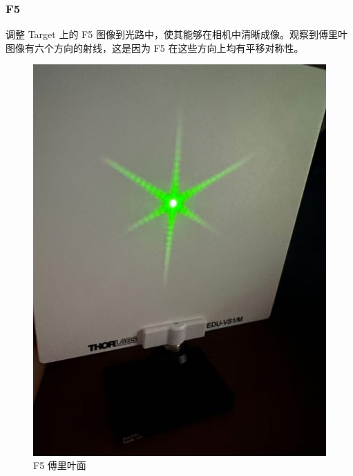 \documentclass{ctexart}
\begin{document}
\subsubsection{F5}
调整 Target 上的 F5 图像到光路中，使其能够在相机中清晰成像。观察到傅里叶图像有六个方向的射线，这是因为 F5 在这些方向上均有平移对称性。
\begin{figure}[H]
  \centering
  \begin{minipage}[b]{0.2\textwidth}
    \centering
    \includegraphics[width=\textwidth]{pictures/微信图片_20241017164855.jpg}
    \caption{F5 傅里叶面}
  \end{minipage}
  \hspace{0.1\textwidth} %
  \begin{minipage}[b]{0.3\textwidth}
    \centering

\end{minipage}
\end{figure}
\end{document}

